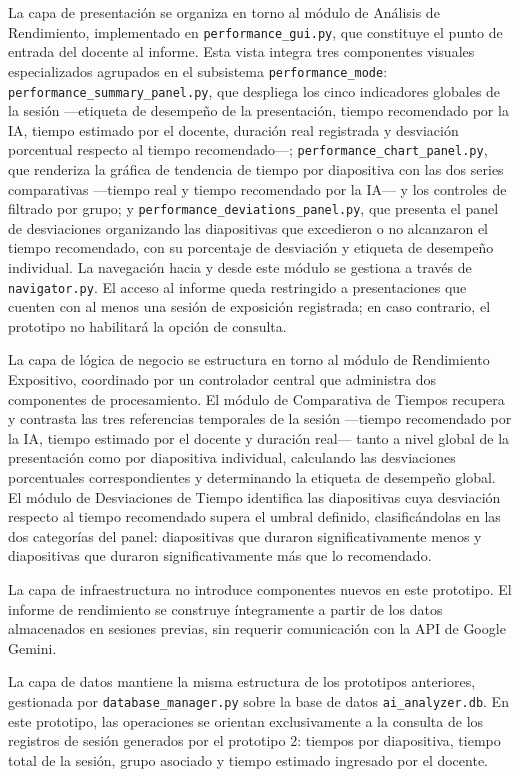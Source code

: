 \documentclass[11pt]{article}
\begin{document}
La capa de presentación se organiza en torno al módulo de Análisis de Rendimiento, implementado en \texttt{performance\_gui.py}, que constituye el punto de entrada del docente al informe. Esta vista integra tres componentes visuales especializados agrupados en el subsistema \texttt{performance\_mode}: \texttt{performance\_\allowbreak summary\_\allowbreak panel.py}, que despliega los cinco indicadores globales de la sesión ---etiqueta de desempeño de la presentación, tiempo recomendado por la IA, tiempo estimado por el docente, duración real registrada y desviación porcentual respecto al tiempo recomendado---; \texttt{performance\_chart\_panel.py}, que renderiza la gráfica de tendencia de tiempo por diapositiva con las dos series comparativas ---tiempo real y tiempo recomendado por la IA--- y los controles de filtrado por grupo; y \texttt{performance\_\allowbreak deviations\_\allowbreak panel.py}, que presenta el panel de desviaciones organizando las diapositivas que excedieron o no alcanzaron el tiempo recomendado, con su porcentaje de desviación y etiqueta de desempeño individual. La navegación hacia y desde este módulo se gestiona a través de \texttt{navigator.py}. El acceso al informe queda restringido a presentaciones que cuenten con al menos una sesión de exposición registrada; en caso contrario, el prototipo no habilitará la opción de consulta.

La capa de lógica de negocio se estructura en torno al módulo de Rendimiento Expositivo, coordinado por un controlador central que administra dos componentes de procesamiento. El módulo de Comparativa de Tiempos recupera y contrasta las tres referencias temporales de la sesión ---tiempo recomendado por la IA, tiempo estimado por el docente y duración real--- tanto a nivel global de la presentación como por diapositiva individual, calculando las desviaciones porcentuales correspondientes y determinando la etiqueta de desempeño global. El módulo de Desviaciones de Tiempo identifica las diapositivas cuya desviación respecto al tiempo recomendado supera el umbral definido, clasificándolas en las dos categorías del panel: diapositivas que duraron significativamente menos y diapositivas que duraron significativamente más que lo recomendado.

La capa de infraestructura no introduce componentes nuevos en este prototipo. El informe de rendimiento se construye íntegramente a partir de los datos almacenados en sesiones previas, sin requerir comunicación con la API de Google Gemini.

La capa de datos mantiene la misma estructura de los prototipos anteriores, gestionada por \texttt{database\_manager.py} sobre la base de datos \texttt{ai\_analyzer.db}. En este prototipo, las operaciones se orientan exclusivamente a la consulta de los registros de sesión generados por el prototipo 2: tiempos por diapositiva, tiempo total de la sesión, grupo asociado y tiempo estimado ingresado por el docente.
\end{document}
